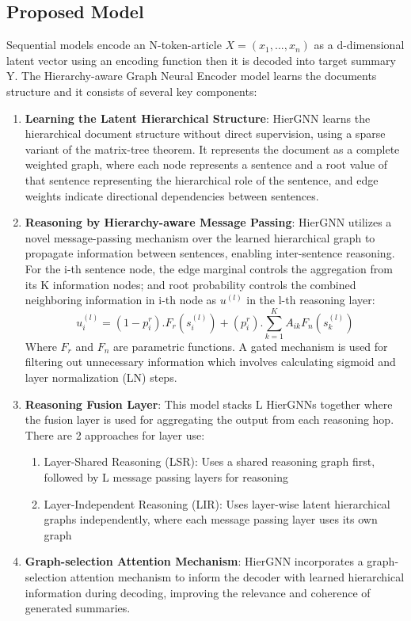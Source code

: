 \documentclass{article}
\begin{document}
\subsection{Proposed Model}
Sequential models encode an N-token-article $X = (x_1, ..., x_n)$ as a d-dimensional latent vector using an encoding function then it is decoded into target summary Y. The Hierarchy-aware Graph Neural Encoder model learns the documents structure and it consists of several key components:
\begin{enumerate}
    \item \textbf{Learning the Latent Hierarchical Structure}: HierGNN learns the hierarchical document structure without direct supervision, using a sparse variant of the matrix-tree theorem. It represents the document as a complete weighted graph, where each node represents a sentence and a root value of that sentence representing the hierarchical role of the sentence, and edge weights indicate directional dependencies between sentences.
    \item \textbf{Reasoning by Hierarchy-aware Message Passing}: HierGNN utilizes a novel message-passing mechanism over the learned hierarchical graph to propagate information between sentences, enabling inter-sentence reasoning. For the i-th sentence node, the edge marginal controls the aggregation from its
        K information nodes; and root probability controls the combined neighboring information in i-th node as $u^{(l)}$ in the l-th reasoning layer: $$u_i^{(l)} = (1 - p_i^r) . F_r(s_i^{(l)}) + (p_i^r) . \sum_{k=1}^{K} A_{ik}F_n(s_k^{(l)})$$ Where $F_r$ and $F_n$ are parametric functions. A gated mechanism is used for filtering out unnecessary information which involves calculating sigmoid and layer normalization (LN) steps.
    \item \textbf{Reasoning Fusion Layer}: This model stacks L HierGNNs together where the fusion layer is used for aggregating the output from each reasoning hop. There are 2 approaches for layer use:
        \begin{enumerate}
          \item Layer-Shared Reasoning (LSR): Uses a shared reasoning graph first, followed by L message passing layers for reasoning
          \item Layer-Independent Reasoning (LIR): Uses layer-wise latent hierarchical graphs independently, where each message passing layer uses its own graph
        \end{enumerate}
    \item \textbf{Graph-selection Attention Mechanism}: HierGNN incorporates a graph-selection attention mechanism to inform the decoder with learned hierarchical information during decoding, improving the relevance and coherence of generated summaries.
\end{enumerate}
\end{document}
